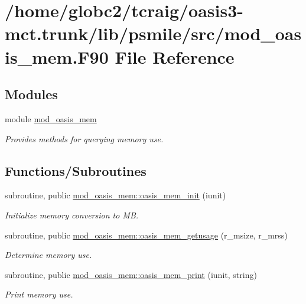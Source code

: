 \hypertarget{mod__oasis__mem_8_f90}{}\section{/home/globc2/tcraig/oasis3-\/mct.trunk/lib/psmile/src/mod\+\_\+oasis\+\_\+mem.F90 File Reference}
\label{mod__oasis__mem_8_f90}
\subsection*{Modules}
\begin{DoxyCompactItemize}
\item 
module \hyperlink{namespacemod__oasis__mem}{mod\+\_\+oasis\+\_\+mem}
\begin{DoxyCompactList}\small\item\em Provides methods for querying memory use. \end{DoxyCompactList}\end{DoxyCompactItemize}
\subsection*{Functions/\+Subroutines}
\begin{DoxyCompactItemize}
\item 
subroutine, public \hyperlink{namespacemod__oasis__mem_a104b7e7e85cd79e731a6e12a14358bbb}{mod\+\_\+oasis\+\_\+mem\+::oasis\+\_\+mem\+\_\+init} (iunit)
\begin{DoxyCompactList}\small\item\em Initialize memory conversion to MB. \end{DoxyCompactList}\item 
subroutine, public \hyperlink{namespacemod__oasis__mem_a2e20a40b48c7a7572f72da1b5d109ce3}{mod\+\_\+oasis\+\_\+mem\+::oasis\+\_\+mem\+\_\+getusage} (r\+\_\+msize, r\+\_\+mrss)
\begin{DoxyCompactList}\small\item\em Determine memory use. \end{DoxyCompactList}\item 
subroutine, public \hyperlink{namespacemod__oasis__mem_ac628b504553edbe9345cd070a8db2634}{mod\+\_\+oasis\+\_\+mem\+::oasis\+\_\+mem\+\_\+print} (iunit, string)
\begin{DoxyCompactList}\small\item\em Print memory use. \end{DoxyCompactList}\end{DoxyCompactItemize}
